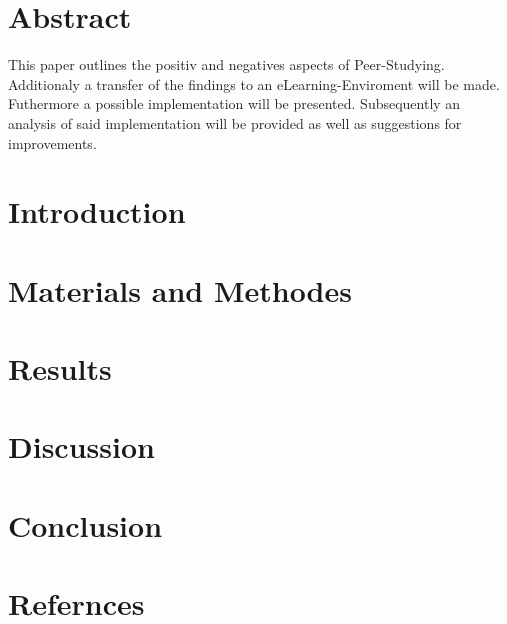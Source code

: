 \documentclass[12pt, a4paper]{article}
\begin{document}
    \tableofcontents

\section{Abstract}
This paper outlines the positiv and negatives aspects of Peer-Studying.
Additionaly a transfer of the findings to an eLearning-Enviroment will be made. 
Futhermore a possible implementation will be presented.
Subsequently an analysis of said implementation  will be provided as well as suggestions
for improvements.

\section{Introduction}
\section{Materials and Methodes}
\section{Results}
\section{Discussion}
\section{Conclusion}
\section{Refernces}
\end{document}
